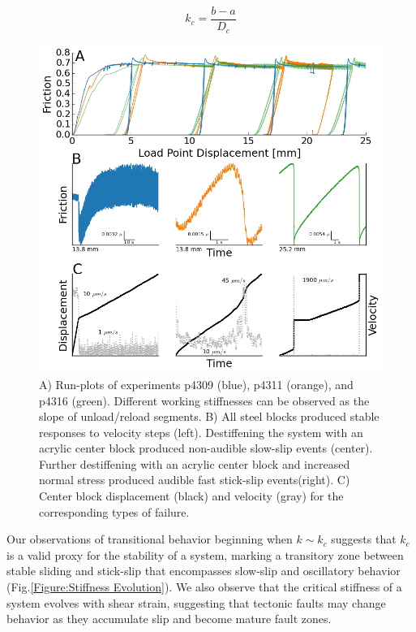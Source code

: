 \documentclass[11pt]{article}
\begin{document}
\begin{equation}
    k_c = \frac{b-a}{D_c}
	\label{equation:kc}
\end{equation}

\begin{figure}
	\centering
		\includegraphics[scale=0.7]{../Figures/Fig_Runplot/runplot.png}
   	\caption{A) Run-plots of experiments p4309 (blue), p4311 (orange), and p4316
   	(green). Different working stiffnesses can be observed as the slope of
   	unload/reload segments. B) All steel blocks produced stable responses to
   	velocity steps (left). Destiffening the system with an acrylic center block
   	produced non-audible slow-slip events (center). Further destiffening with an
   	acrylic center block and increased normal stress produced audible fast
   	stick-slip events(right). C) Center block displacement (black) and velocity
   	(gray) for the corresponding types of failure.}
  	\label{Figure:Runplot}
\end{figure}

Our observations of transitional behavior beginning when $k \sim k_c$ suggests
that $k_c$ is a valid proxy for the stability of a system, marking a transitory
zone between stable sliding and stick-slip that encompasses slow-slip and
oscillatory behavior (Fig.\ref{Figure:Stiffness Evolution}). We also observe that the critical stiffness of a system
evolves with shear strain, suggesting that tectonic faults may change behavior
as they accumulate slip and become mature fault zones.
\end{document}
